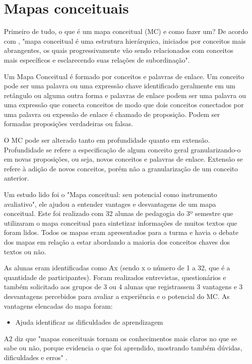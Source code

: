 \section[Mapas Conceituais]{Mapas conceituais}

Primeiro de tudo, o que é um mapa conceitual (MC) e como fazer um? De acordo com , "mapa conceitual é uma estrutura hierárquica, iniciados por conceitos mais abrangentes, os quais progressivamente vão sendo relacionados com conceitos mais específicos e esclarecendo suas relações de subordinação". 

Um Mapa Conceitual é formado por conceitos e palavras de enlace. Um conceito pode ser uma palavra ou uma expressão chave identificado geralmente em um retângulo ou alguma outra forma e palavras de enlace podem ser uma palavra ou uma expressão que conecta conceitos de modo que dois conceitos conectados por uma palavra ou expessão de enlace é chamado de proposição. Podem ser formadas proposições verdadeiras ou falsas.

O MC pode ser alterado tanto em profundidade quanto em extensão. Profundidade se refere a especificação de algum conceito geral granularizando-o em novas proposições, ou seja, novos conceitos e palavras de enlace. Extensão se refere à adição de novos conceitos, porém não a granularização de um conceito anterior.


Um estudo lido foi o "Mapa conceitual: seu potencial como instrumento avaliativo", ele ajudou a entender vantages e desvantagens de um mapa conceitual. Este foi realizado com 32 alunas de pedagogia do 3º semestre que utilizaram o mapa conceitual para sintetizar informações de muitos textos que foram lidos. Todos os mapas eram apresentados para a turma e havia o debate dos mapas em relação a estar abordando a maioria dos conceitos chaves dos textos ou não. 

As alunas eram identificadas como Ax (sendo x o número de 1 a 32, que é a quantidade de participantes). Foram realizados entrevistas, questionários e também solicitado aos grupos de 3 ou 4 alunas que registrassem 3 vantagens e 3 desvantagens percebidos para avaliar a experiência e o potencial do MC. As vantagens elencadas do mapa foram: 

\begin{itemize}
\item Ajuda identificar as dificuldades de aprendizagem
\end{itemize}

A2 diz que "mapas conceituais tornam os conhecimentos mais claros no que se sabe ou não, porque evidencia o que foi aprendido, mostrando também dúvidas, dificuldades e erros" \cite{vantagensDesvantagensMC}.


